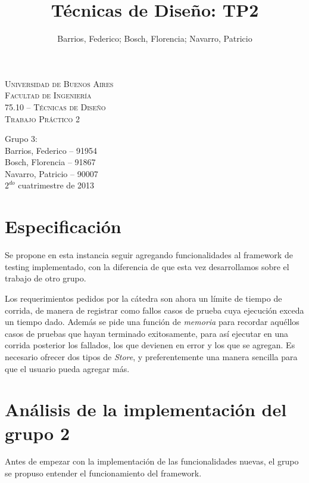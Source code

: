 \documentclass[12pt]{article}
\title{Técnicas de Diseño: TP2}
\author{Barrios, Federico; Bosch, Florencia; Navarro, Patricio}
\begin{document}
\begin{center}
\vspace*{7 cm}
\textsc{\LARGE Universidad de Buenos Aires}\\[0.3cm]
\textsc{\LARGE Facultad de Ingeniería}\\[1.2cm]
\textsc{\Large 75.10 -- Técnicas de Diseño}\\[0.3cm]
\textsc{\Large Trabajo Práctico 2}\\[1.2cm]
\end{center}

\begin{flushright}
{\large
Grupo 3:\\[0.1cm]
Barrios, Federico -- 91954\\
Bosch, Florencia -- 91867\\
Navarro, Patricio -- 90007\\[0.4cm]
$2^{do}$ cuatrimestre de 2013}
\end{flushright}

\thispagestyle{empty}

\newpage

\tableofcontents
\setcounter{page}{1}
\newpage

\section{Especificación}
Se propone en esta instancia seguir agregando funcionalidades al framework de testing implementado,
con la diferencia de que esta vez desarrollamos sobre el trabajo de otro grupo. 

Los requerimientos 
pedidos por la cátedra son ahora un límite de tiempo de corrida, de manera de registrar como fallos
casos de prueba cuya ejecución exceda un tiempo dado. Además se pide una función de \textit{memoria}
para recordar aquéllos casos de pruebas que hayan terminado exitosamente, para así ejecutar en una
corrida posterior los fallados, los que devienen en error y los que se agregan. Es necesario ofrecer
dos tipos de \textit{Store}, y preferentemente una manera sencilla para que el usuario pueda agregar más.

\section{Análisis de la implementación del grupo 2}
Antes de empezar con la implementación de las funcionalidades nuevas, el grupo se propuso entender el 
funcionamiento del framework.
\end{document}
